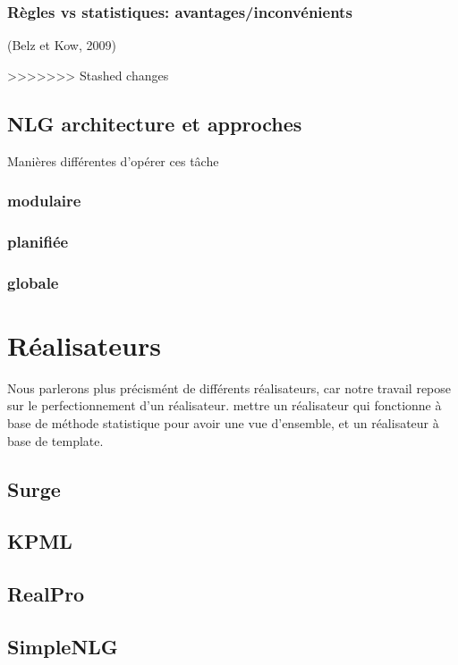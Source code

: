 \subsubsection{Règles vs statistiques: avantages/inconvénients}
(Belz et Kow, 2009)

>>>>>>> Stashed changes

\subsection{NLG architecture et approches}

Manières différentes d'opérer ces tâche

\subsubsection{modulaire}
\subsubsection{planifiée}
\subsubsection{globale}

\section{Réalisateurs}

Nous parlerons plus précismént de différents réalisateurs, car notre travail repose sur le perfectionnement d'un réalisateur.
mettre un réalisateur qui fonctionne à base de méthode statistique pour avoir une vue d'ensemble, et un réalisateur à base de template.

\subsection{Surge}

\subsection{KPML}

\subsection{RealPro}

\subsection{SimpleNLG}

